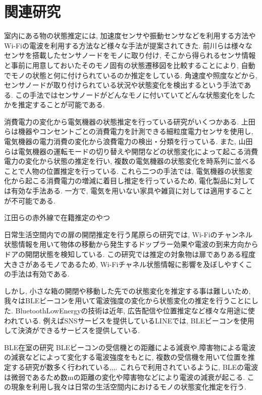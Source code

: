 \documentclass[Japanese]{dicomopapers}
\begin{document}
\section{関連研究}
室内にある物の状態推定には, 加速度センサや振動センサなどを利用する方法やWi-Fiの電波を利用する方法など様々な手法が提案されてきた.
前川ら\cite{TagAndThink}は様々なセンサを搭載したセンサノードをモノに取り付け, そこから得られるセンサ情報と事前に用意しておいたそのモノ固有の状態遷移図を比較することにより, 自動でモノの状態と何に付けられているのか推定をしている.
角速度や照度などから, センサノードが取り付けられている状況や状態変化を検出するという手法である.
この手法ではセンサノードがどんなモノに付いていてどんな状態変化をしたかを推定することが可能である.


消費電力の変化から電気機器の状態推定を行っている研究がいくつかある.
上田ら\cite{sairyu}は機器やコンセントごとの消費電力を計測できる細粒度電力センサを使用し, 電気機器の電力消費の変化から浪費電力の検出・分類を行っている.
また, 山田ら\cite{energy}は電気機器の運転モードの切り替えや開閉などの状態変化によって起こる消費電力の変化から状態の推定を行い, 複数の電気機器の状態変化を時系列に並べることで人物の位置推定を行っている.
これら二つの手法では, 電気機器の状態変化から起こる消費電力の増減に着目し推定を行っているため, 電化製品に対しては有効な手法ある.
一方で, 電気を用いない家具や雑貨に対しては適用することが不可能である.

江田ら\cite{redLine}の赤外線で在籍推定のやつ


日常生活空間内での扉の開閉推定を行う尾原ら\cite{WifiChannel}の研究では, Wi-Fiのチャンネル状態情報を用いて物体の移動から発生するドップラー効果や電波の到来方向からドアの開閉状態を検知している.
この研究では推定の対象物は扉でありある程度大きさがあるモノであるため, Wi-Fiチャネル状態情報に影響を及ぼしやすくこの手法は有効である.

しかし, 小さな箱の開閉や移動した先での状態変化を推定する事は難しいため, 我々はBLEビーコンを用いて電波強度の変化から状態変化の推定を行うことにした.
BluetoothLowEnergyの技術は近年, 広告配信や位置推定など様々な用途に使われている.
例えばSNSサービスを提供しているLINEでは, BLEビーコンを使用して決済ができるサービスを提供している.\cite{bleUse}


BLE在室の研究
BLEビーコンの受信機との距離による減衰や,障害物による電波の減衰などによって変化する電波強度をもとに, 複数の受信機を用いて位置を推定する研究が数多く行われている\cite{IoMT},\cite{tandem},\cite{blespot},\cite{LANgate}.
これらで利用されているように, BLEの電波は微弱であるため数mの距離の変化や障害物などにより電波の減衰が起こる.
この現象を利用し我々は日常の生活空間内におけるモノの状態変化推定を行う.
\end{document}

